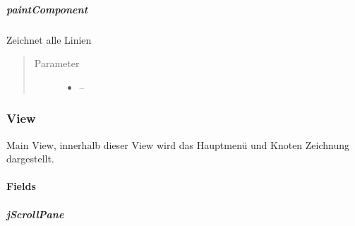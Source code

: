 \documentclass[letterpaper,10pt,ngerman]{sphinxmanual}
\begin{document}
\subparagraph{paintComponent}
\label{\detokenize{com/linuxluigi/edu/view/NodePanel:paintcomponent}}

\begin{fulllineitems}
\label{\detokenize{com/linuxluigi/edu/view/NodePanel:com.linuxluigi.edu.view.NodePanel.paintComponent(Graphics)}}
Zeichnet alle Linien
\begin{quote}\begin{description}
\item[{Parameter}] \leavevmode\begin{itemize}
\item {} 
 -- 

\end{itemize}

\end{description}\end{quote}

\end{fulllineitems}



\subsubsection{View}
\label{\detokenize{com/linuxluigi/edu/view/View:view}}\label{\detokenize{com/linuxluigi/edu/view/View::doc}}

\begin{fulllineitems}
\label{\detokenize{com/linuxluigi/edu/view/View:com.linuxluigi.edu.view.View}}
Main View, innerhalb dieser View wird das Hauptmenü und Knoten Zeichnung dargestellt.

\end{fulllineitems}



\paragraph{Fields}
\label{\detokenize{com/linuxluigi/edu/view/View:fields}}

\subparagraph{jScrollPane}
\label{\detokenize{com/linuxluigi/edu/view/View:jscrollpane}}

\begin{fulllineitems}
\label{\detokenize{com/linuxluigi/edu/view/View:com.linuxluigi.edu.view.View.jScrollPane}}
\end{fulllineitems}
\end{document}
